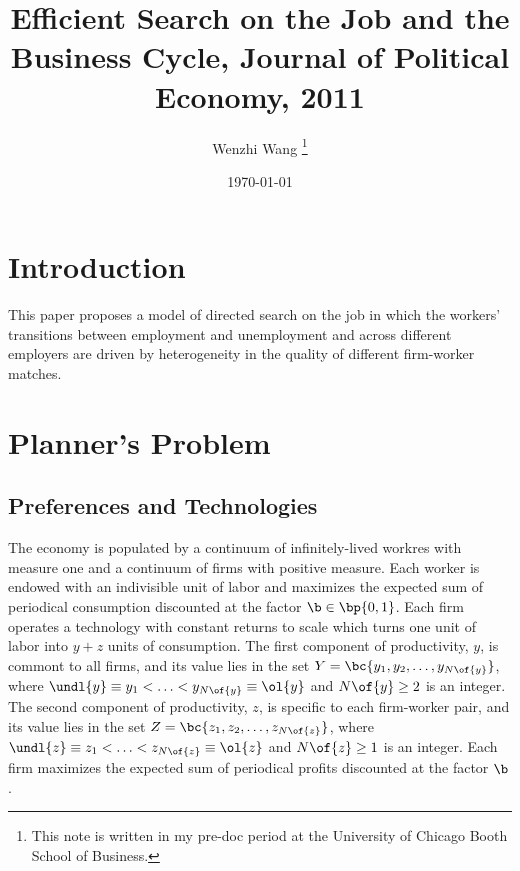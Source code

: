 \documentclass[12pt]{article}
\theoremstyle{definition}
\begin{document}
 


\title{\bf Efficient Search on the Job and the Business Cycle, Journal of Political Economy, 2011} 
\author{Wenzhi Wang \thanks{This note is written in my pre-doc period at the University of Chicago Booth School of Business.} } 
\date{\today} 
\maketitle 

\citet{menzioEfficientSearchJob2011}

\section{Introduction}

This paper proposes a model of directed search on the job in which the workers' transitions between employment and unemployment and across different employers are driven by heterogeneity in the quality of different firm-worker matches. 


\section{Planner's Problem} \label{sec_planners_problem}

\subsection{Preferences and Technologies}


The economy is populated by a continuum of infinitely-lived workres with measure one and a continuum of firms with positive measure. Each worker is endowed with an indivisible unit of labor and maximizes the expected sum of periodical consumption discounted at the factor $\b \in \bp{0, 1}$. Each firm operates a technology with constant returns to scale which turns one unit of labor into $y+z$ units of consumption. The first component of productivity, $y$, is commont to all firms, and its value lies in the set $Y = \bc{y_1, y_2, \ldots, y_{N\of{y}}}$, where $\undl{y} \equiv y_1 < \ldots < y_{N\of{y}} \equiv \ol{y}$ and $N\of{y} \geq 2$ is an integer. The second component of productivity, $z$, is specific to each firm-worker pair, and its value lies in the set $Z = \bc{z_1, z_2, \ldots, z_{N\of{z}}}$, where $\undl{z} \equiv z_1 < \ldots < z_{N\of{z}} \equiv \ol{z}$ and $N\of{z} \geq 1$ is an integer. Each firm maximizes the expected sum of periodical profits discounted at the factor $\b$. 
\end{document}
